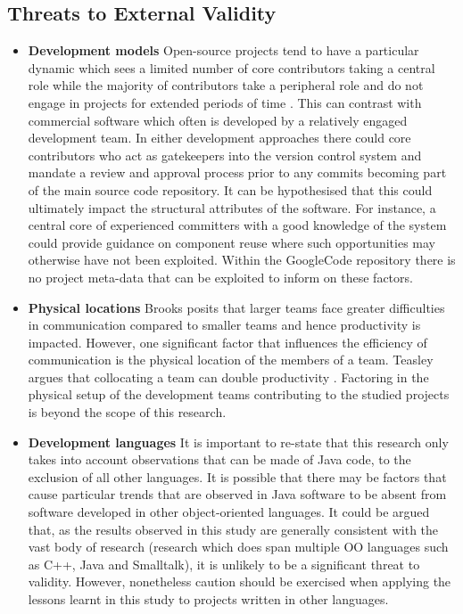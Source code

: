 \subsection{Threats to External Validity}

\begin{itemize}
\item  \textbf{Development models} Open-source projects tend to have a particular dynamic which sees a limited number of core contributors taking a central role while the majority of contributors take a peripheral role and do not engage in projects for extended periods of time \citep{howison2006social}. This can contrast with commercial software which often is developed by a relatively engaged development team. In either development approaches there could core contributors who act as gatekeepers into the version control system and mandate a review and approval process prior to any commits becoming part of the main source code repository. It can be hypothesised that this could ultimately impact the structural attributes of the software. For instance, a central core of experienced committers with a good knowledge of the system could provide guidance on component reuse where such opportunities may otherwise have not been exploited. Within the GoogleCode repository there is no project meta-data that can be exploited to inform on these factors.

\item  \textbf{Physical locations} Brooks posits that larger teams face greater difficulties in communication compared to smaller teams and hence productivity is impacted. However, one significant factor that influences the efficiency of communication is the physical location of the members of a team. Teasley argues that collocating a team can double productivity \citep{teasley2000does}. Factoring in the physical setup of the development teams contributing to the studied projects is beyond the scope of this research.

\item  \textbf{Development languages} It is important to re-state that this research only takes into account observations that can be made of Java code, to the exclusion of all other languages. It is possible that there may be factors that cause particular trends that are observed in Java software to be absent from software developed in other object-oriented languages. It could be argued that, as the results observed in this study are generally consistent with the vast body of research (research which does span multiple OO languages such as C++, Java and Smalltalk), it is unlikely to be a significant threat to validity. However, nonetheless caution should be exercised when applying the lessons learnt in this study to projects written in other languages.


\end{itemize}
